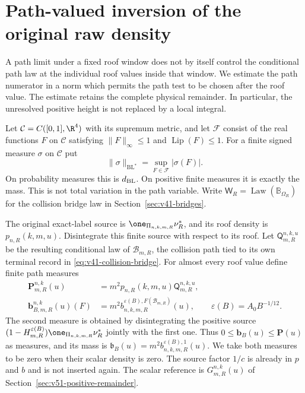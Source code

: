 \section{Path-valued inversion of the original raw density}
\label{sec:v52-path-inversion}
A path limit under a fixed roof window does not by itself control the
conditional path law at the individual roof values inside that window.
We estimate the path numerator in a norm which permits the path test to
be chosen after the roof value. The estimate retains the complete
physical remainder. In particular, the unresolved positive height is
not replaced by a local integral.

Let $\mathcal C=C([0,1],\R^4)$ with its supremum metric, and let
$\mathcal F$ consist of the real functions $F$ on $\mathcal C$ satisfying
$\|F\|_\infty\le1$ and $\operatorname{Lip}(F)\le1$. For a finite signed
measure $\sigma$ on $\mathcal C$ put
\[
 \|\sigma\|_{\mathrm{BL}^*}=\sup_{F\in\mathcal F}|\sigma(F)|.
\]
On probability measures this is $d_{\rm BL}$. On positive finite
measures it is exactly the mass. This is not total variation in the
path variable. Write $\mathsf W_R=\operatorname{Law}(\mathbb B_{\Omega_R})$
for the collision bridge law in Section~\ref{sec:v41-bridges}.

The original exact-label source is
$\one_{\Pi_{n,k,m,R}}\nu_R^*$, and its roof density is $p_{n,R}(k,m,u)$.
Disintegrate this finite source with respect to its roof. Let
$\mathsf Q_{m,R}^{n,k,u}$ be the resulting conditional law of
$\mathcal B_{m,R}$, the collision path tied to its own terminal record
in \eqref{eq:v41-collision-bridge}. For almost every roof value define
finite path measures
\begin{align}
 \mathbf P_{m,R}^{n,k}(u)&=m^2p_{n,R}(k,m,u)\mathsf Q_{m,R}^{n,k,u},
                                      \label{eq:v52-path-density}\\
 \mathbf b_{B,m,R}^{n,k}(u)(F)
  &=m^2b^{\varepsilon(B),F(\mathcal B_{m,R})}_{n,k,m,R}(u),
 \qquad \varepsilon(B)=A_0B^{-1/12}.    \label{eq:v52-bad-path-density}
\end{align}
The second measure is obtained by disintegrating the positive source
$(1-H_{m,R}^{\varepsilon(B)})\one_{\Pi_{n,k,m,R}}\nu_R^*$ jointly
with the first one. Thus
$0\le\mathbf b_B(u)\le\mathbf P(u)$ as measures, and its mass is
$\mathfrak b_B(u)=m^2b^{\varepsilon(B),1}_{n,k,m,R}(u)$.
We take both measures to be zero when their scalar density is zero.
The source factor $1/c$ is already in $p$ and $b$ and is not inserted
again. The scalar reference is $G_{m,R}^{n,k}(u)$ of
Section~\ref{sec:v51-positive-remainder}.

